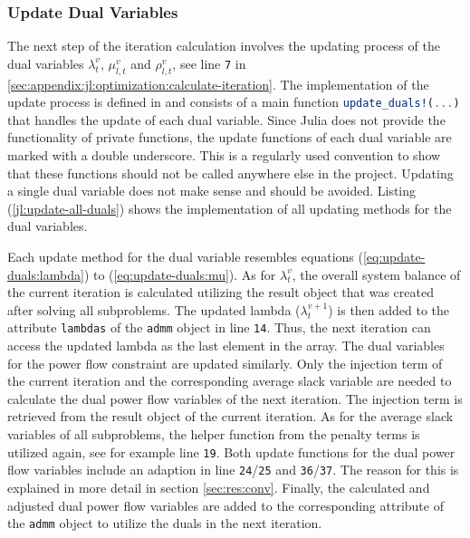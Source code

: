 \subsubsection*{Update Dual Variables}

The next step of the iteration calculation involves the updating process of the dual variables $\lambda_{t}^v$, $\mu_{l,t}^v$ and $\rho_{l,t}^v$, see line \texttt{7} in \ref{sec:appendix:jl:optimization:calculate-iteration}. The implementation of the update process is defined in  and consists of a main function \lstinline[language=julia]{update_duals!(...)} that handles the update of each dual variable. Since Julia does not provide the functionality of private functions, the update functions of each dual variable are marked with a double underscore. This is a regularly used convention to show that these functions should not be called anywhere else in the project. Updating a single dual variable does not make sense and should be avoided. Listing (\ref{jl:update-all-duals}) shows the implementation of all updating methods for the dual variables.



Each update method for the dual variable resembles equations (\ref{eq:update-duals:lambda}) to (\ref{eq:update-duals:mu}). As for $\lambda_{t}^v$, the overall system balance of the current iteration is calculated utilizing the result object that was created after solving all subproblems. The updated lambda ($\lambda_{t}^{v+1}$) is then added to the attribute \lstinline[language=julia]{lambdas} of the \lstinline[language=julia]{admm} object in line \texttt{14}. Thus, the next iteration can access the updated lambda as the last element in the array. The dual variables for the power flow constraint are updated similarly. Only the injection term of the current iteration and the corresponding average slack variable are needed to calculate the dual power flow variables of the next iteration. The injection term is retrieved from the result object of the current iteration. As for the average slack variables of all subproblems, the helper function from the penalty terms is utilized again, see for example line \texttt{19}. Both update functions for the dual power flow variables include an adaption in line \texttt{24}/\texttt{25} and \texttt{36}/\texttt{37}. The reason for this is explained in more detail in section \ref{sec:res:conv}. Finally, the calculated and adjusted dual power flow variables are added to the corresponding attribute of the \lstinline[language=julia]{admm} object to utilize the duals in the next iteration.

